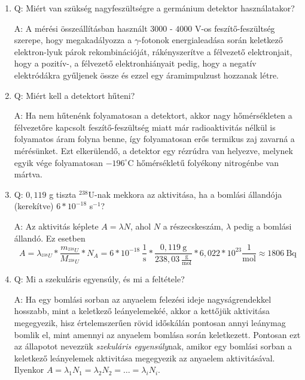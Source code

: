 \begin{enumerate}
    \item Q: Miért van szükség nagyfeszültségre a germánium detektor használatakor?
    \begin{displayquote}
        A: A mérési összeállításban használt $3000$ - $4000$ V-os feszítő-feszültség szerepe, hogy megakadályozza a $\gamma$-fotonok energialeadása során keletkező elektron-lyuk párok rekombinációját, rákényszerítve a félvezető elektronjait, hogy a pozitív-, a félvezető elektronhiányait pedig, hogy a negatív elektródákra gyűljenek össze és ezzel egy áramimpulzust hozzanak létre.
    \end{displayquote}
    
    \item Q: Miért kell a detektort hűteni?
    \begin{displayquote}
        A: Ha nem hűtenénk folyamatosan a detektort, akkor nagy hőmérsékleten a félvezetőre kapcsolt feszítő-feszültség miatt már radioaktivitás nélkül is folyamatos áram folyna benne, így folyamatosan erős termikus zaj zavarná a mérésünket. Ezt elkerülendő, a detektor egy rézrúdra van helyezve, melynek egyik vége folyamatosan $-196^{\circ}$C hőmérsékletű folyékony nitrogénbe van mártva.
    \end{displayquote}
    
    \item Q: $0,119$ g tiszta $^{238}$U-nak mekkora az aktivitása, ha a bomlási állandója (kerekítve) $6 * 10^{-18}$ s$^{-1}$?
    \begin{displayquote}
        A: Az aktivitás képlete $A = \lambda N$, ahol $N$ a részecskeszám, $\lambda$ pedig a bomlási állandó. Ez esetben
        \begin{equation}
            A
            =
            \lambda_{^{238}U}
            *
            \frac{m_{^{238}U}}{M_{^{238}U}}
            *
            N_{A}
            =
            6 * 10^{-18}\ \frac{1}{\text{s}}
            *
            \frac{0,119\ \text{g}}{238,03\ \frac{\text{g}}{\text{mol}}}
            *
            6,022 * 10^{23} \frac{1}{\text{mol}}
            \approx
            1806\ \text{Bq}
        \end{equation}
    \end{displayquote}
    
    \item Q: Mi a szekuláris egyensúly, és mi a feltétele?
    \begin{displayquote}
        A: Ha egy bomlási sorban az anyaelem felezési ideje nagyságrendekkel hosszabb, mint a keletkező leányelemekéé, akkor a kettőjük aktivitása megegyezik, hisz értelemszerűen rövid időskálán pontosan annyi leánymag bomlik el, mint amennyi az anyaelem bomlása során keletkezett. Pontosan ezt az állapotot nevezzük \emph{szekuláris egyensúly}nak, amikor egy bomlási sorban a keletkező leányelemek aktivitása megegyezik az anyaelem aktivitásával. Ilyenkor $A = \lambda_{1} N_{1} = \lambda_{2} N_{2} = \dots = \lambda_{i} N_{i}$.
    \end{displayquote}
    

\end{enumerate}

